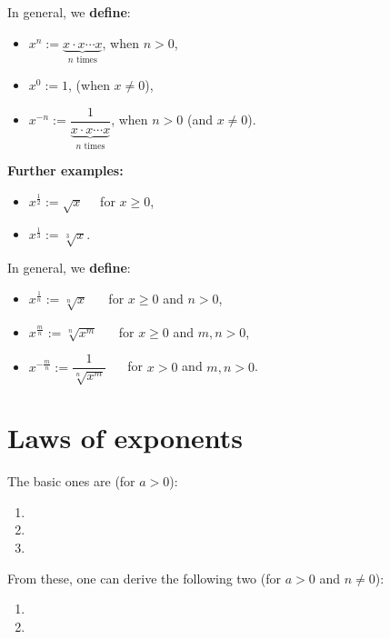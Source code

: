 \documentclass[
  english,
  12pt,
  oneside]{book}
\providecommand{\tightlist}{%
  \setlength{\itemsep}{0pt}\setlength{\parskip}{0pt}}
\theoremstyle{definition}
\theoremstyle{definition}
\theoremstyle{definition}
\theoremstyle{definition}
\theoremstyle{remark}
\begin{document}
In general, we \textbf{define}:

\begin{itemize}
\tightlist
\item
  \(x^n := \underbrace{x\cdot x\cdots x}_{n\text{ times}}\), when \(n>0\),
\item
  \(x^0 := 1\), (when \(x\not=0\)),
\item
  \(x^{-n} := \dfrac{1}{\underbrace{x\cdot x\cdots x}_{n\text{ times}}}\), when \(n>0\) (and \(x\not=0\)).
\end{itemize}

\textbf{Further examples:}

\begin{itemize}
\tightlist
\item
  \(x^{\frac{1}{2}} := \sqrt{x}\)~~ for \(x\geq 0\),
\item
  \(x^{\frac{1}{3}} := \sqrt[3]{x}\).
\end{itemize}

In general, we \textbf{define}:

\begin{itemize}
\tightlist
\item
  \(x^{\frac{1}{n}} := \sqrt[n]{x}\) ~~ for \(x\geq0\) and \(n>0\),
\item
  \(x^{\frac{m}{n}} := \sqrt[n]{x^m}\) ~~ for \(x\geq0\) and \(m,n>0\),
\item
  \(x^{-\frac{m}{n}} := \dfrac{1}{\sqrt[n]{x^m}}\) ~~ for \(x>0\) and \(m,n>0\).
\end{itemize}

\section{Laws of exponents}\label{laws-of-exponents}

The basic ones are (for \(a>0\)):

\begin{enumerate}
\def\labelenumi{\arabic{enumi}.}
\item
\item
\item
\end{enumerate}

From these, one can derive the following two (for \(a>0\) and \(n\not=0\)):

\begin{enumerate}
\def\labelenumi{\arabic{enumi}.}
\setcounter{enumi}{3}
\item
\item
\end{enumerate}
\end{document}
